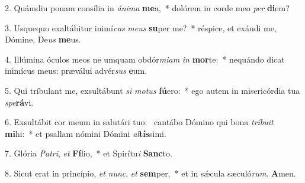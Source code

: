 2. Quámdiu ponam consília in \textit{á}\textit{ni}\textit{ma} \textbf{me}a,~*  dolórem in corde meo \textit{per} \textbf{di}em?\

3. Usquequo exaltábitur inimí\textit{cus} \textit{me}\textit{us} \textbf{su}per me?~*  réspice, et exáudi me, Dómine, De\textit{us} \textbf{me}us.\

4. Illúmina óculos meos ne umquam obdór\textit{mi}\textit{am} \textit{in} \textbf{mor}te:~*  nequándo dicat inimícus meus: præválui advér\textit{sus} \textbf{e}um.\

5. Qui tríbulant me, exsultábunt \textit{si} \textit{mo}\textit{tus} \textbf{fú}ero:~*  ego autem in misericórdia tua \textit{spe}\textbf{rá}vi.\

6. Exsultábit cor meum in salutári tuo: \dag\  cantábo Dómino qui bona \textit{trí}\textit{bu}\textit{it} \textbf{mi}hi:~*  et psallam nómini Dómini \textit{al}\textbf{tís}simi.\

7. Glória \textit{Pa}\textit{tri}, \textit{et} \textbf{Fí}lio,~*  et Spirítu\textit{i} \textbf{Sanc}to.\

8. Sicut erat in princípio, \textit{et} \textit{nunc}, \textit{et} \textbf{sem}per,~*  et in sǽcula sæculó\textit{rum}. \textbf{A}men.\

